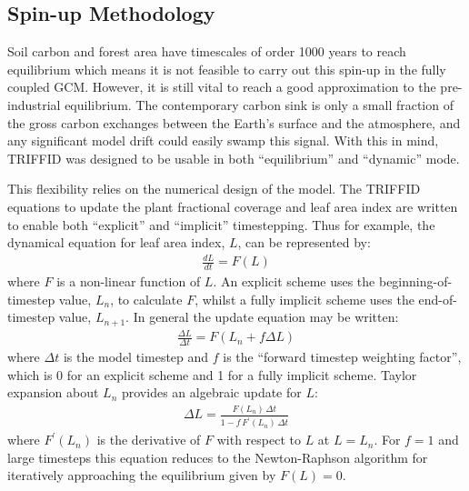\documentclass[a4paper]{article}
\newcommand{\gnl}{GENIE-land}
\begin{document}

\subsection{Spin-up Methodology}\label{s:TRIF.spin}
Soil carbon and forest area have timescales of order 1000 years to
reach equilibrium which means it is not feasible to carry out this
spin-up in the fully coupled GCM. However, it is still vital to reach
a good approximation to the pre-industrial equilibrium. The
contemporary carbon sink is only a small fraction of the gross carbon
exchanges between the Earth's surface and the atmosphere, and any
significant model drift could easily swamp this signal. With this in
mind, TRIFFID was designed to be usable in both ``equilibrium'' and
``dynamic'' mode.

This flexibility relies on the numerical design of the model. The
TRIFFID equations to update the plant fractional coverage and leaf
area index are written to enable both ``explicit'' and ``implicit''
timestepping. Thus for example, the dynamical equation for leaf area
index, $L$, can be represented by:
\begin{eqnarray}
\frac{d L}{dt} = F(L)
\end{eqnarray}
where $F$ is a non-linear function of $L$. An explicit scheme uses the
beginning-of-timestep value, $L_{n}$, to calculate $F$, whilst a fully
implicit scheme uses the end-of-timestep value, $L_{n+1}$. In general
the update equation may be written:
\begin{eqnarray}
\frac{\Delta L}{\Delta t} = F (L_{n} + f \Delta L)
\end{eqnarray}
where $\Delta t$ is the model timestep and $f$ is the ``forward
timestep weighting factor'', which is 0 for an explicit scheme and 1
for a fully implicit scheme. Taylor expansion about $L_{n}$ provides
an algebraic update for $L$:
\begin{eqnarray}
\Delta L = \frac{F(L_{n}) \, \Delta t}{1 - f \, F^{'}(L_n) \, \Delta t}
\label{e:update}
\end{eqnarray}
where $F^{'}(L_n)$ is the derivative of $F$ with respect to $L$ at
$L=L_{n}$.  For $f=1$ and large timesteps this equation reduces to the
Newton-Raphson algorithm for iteratively approaching the equilibrium
given by $F(L)=0$.
\end{document}
